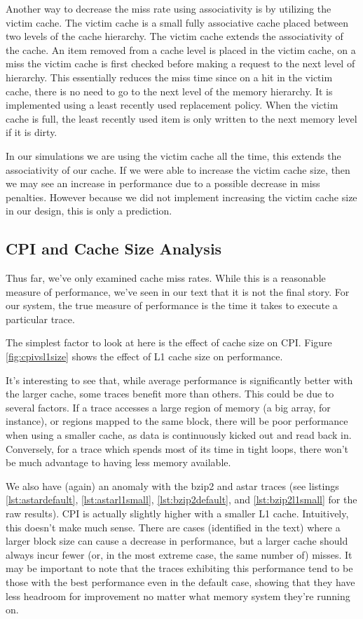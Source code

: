 \documentclass{article}
\begin{document}
Another way to decrease the miss rate using associativity is by utilizing the victim cache. The victim cache is a small fully associative cache placed between two levels of the cache hierarchy. The victim cache extends the associativity of the cache. An item removed from a cache level is placed in the victim cache, on a miss the victim cache is first checked before making a request to the next level of hierarchy. This essentially reduces the miss time since on a hit in the victim cache, there is no need to go to the next level of the memory hierarchy. It is implemented using a least recently used replacement policy. When the victim cache is full, the least recently used item is only written to the next memory level if it is dirty. 

In our simulations we are using the victim cache all the time, this extends the associativity of our cache. If we were able to increase the victim cache size, then we may see an increase in performance due to a possible decrease in miss penalties. However because we did not implement increasing the victim cache size in our design, this is only a prediction. 

\subsection{CPI and Cache Size Analysis}

Thus far, we've only examined cache miss rates. While this is a reasonable
measure of performance, we've seen in our text that it is not the final story.
For our system, the true measure of performance is the time it takes to execute
a particular trace.

The simplest factor to look at here is the effect of cache size on CPI. Figure
\ref{fig:cpivsl1size} shows the effect of L1 cache size on performance.

It's interesting to see that, while average performance is significantly better
with the larger cache, some traces benefit more than others. This could be due
to several factors. If a trace accesses a large region of memory (a big array,
for instance), or regions mapped to the same block, there will be poor
performance when using a smaller cache, as data is continuously kicked out and
read back in. Conversely, for a trace which spends most of its time in tight
loops, there won't be much advantage to having less memory available.

We also have (again) an anomaly with the bzip2 and astar traces (see listings
\ref{lst:astardefault}, \ref{lst:astarl1small},
\ref{lst:bzip2default}, and \ref{lst:bzip2l1small} for the raw results). CPI is
actually slightly higher with a smaller L1 cache. Intuitively, this doesn't make
much sense. There are cases (identified in the text) where a larger block size
can cause a decrease in performance, but a larger cache should always incur
fewer (or, in the most extreme case, the same number of) misses. It may be
important to note that the traces exhibiting this performance tend to be those
with the best performance even in the default case, showing that they have less
headroom for improvement no matter what memory system they're running on.
\end{document}
